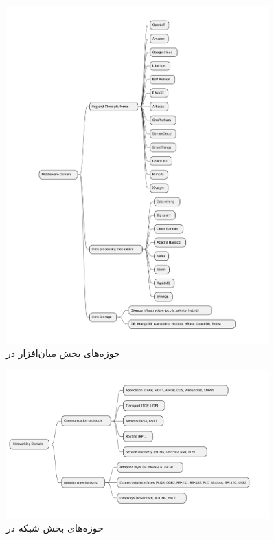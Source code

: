 \begin{figure}[H]
  \centering
  \includegraphics[width=0.9\textwidth]{./figures/IoT_middleware_domains.pdf}
  \caption{حوزه‌های بخش میان‌افزار در }
  \label{fig:iotMiddlewareDomains}
\end{figure}

\begin{figure}[H]
  \centering
  \includegraphics[width=0.9\textwidth]{./figures/IoT_network_domains.pdf}
  \caption{حوزه‌های بخش شبکه در }
  \label{fig:iotNetworkingDomains}
\end{figure}

